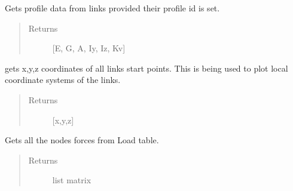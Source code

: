 \documentclass[letterpaper,10pt,english]{sphinxmanual}
\begin{document}
\begin{fulllineitems}
\begin{fulllineitems}
\end{fulllineitems}


\begin{fulllineitems}
\label{\detokenize{api:beamon.database.Database.get_links_profiles}}
Gets profile data from links provided their profile id is set.
\begin{quote}\begin{description}
\item[{Returns}] \leavevmode
{[}E, G, A, Iy, Iz, Kv{]}

\end{description}\end{quote}

\end{fulllineitems}


\begin{fulllineitems}
\label{\detokenize{api:beamon.database.Database.get_links_starting_points}}
gets x,y,z coordinates of all links start points.
This is being used to plot local coordinate systems of the links.
\begin{quote}\begin{description}
\item[{Returns}] \leavevmode
{[}x,y,z{]}

\end{description}\end{quote}

\end{fulllineitems}


\begin{fulllineitems}
\label{\detokenize{api:beamon.database.Database.get_loads}}
Gets all the nodes forces from Load table.
\begin{quote}\begin{description}
\item[{Returns}] \leavevmode
list matrix


\end{description}
\end{quote}
\end{fulllineitems}
\end{fulllineitems}
\end{document}
